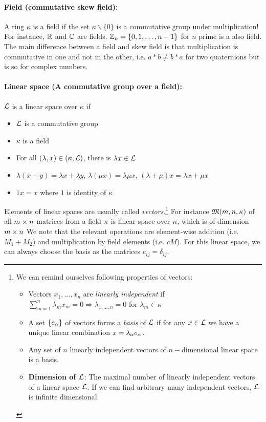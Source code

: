 \paragraph{Field (commutative skew field):} A ring $\kappa$ is a field if the set $\kappa\backslash \{0\}$ is a commutative group under multiplication! For instance, $\mathbb{R}$ and $\mathbb{C}$ are fields. $\mathbb{Z}_n=\{0,1,\dots,n-1\}$ for $n$ prime is a also field. The main difference between a field and skew field is that multiplication is commutative in one and not in the other, i.e. $a*b\ne b*a$ for two quaternions but is so for complex numbers.

\paragraph{Linear space (A commutative group over a field):} $\mathcal{L}$ is a linear space over $\kappa$ if
\begin{itemize}
	\item  $\mathcal{L}$ is a commutative group
	\item $\kappa$ is a field
	\item For all $(\lambda,x)\in (\kappa,\mathcal{L})$, there is $\lambda x\in \mathcal{L}$
	\item $\lambda(x+y)=\lambda x+\lambda y$, $\lambda (\mu x)=\lambda \mu x$, $(\lambda+\mu)x=\lambda x+\mu x$
	\item $1x=x$ where $1$ is identity of $\kappa$
\end{itemize}
Elements of linear spaces are usually called \emph{vectors}.\footnote{
	We can remind ourselves following properties of vectors:
	\begin{itemize}
		\item 
		Vectors $x_1,\dots,x_n$ are \emph{linearly independent} if $\sum\limits_{m=1}^{n}\lambda_mx_m=0 \Rightarrow \lambda_{1,\dots,n}=0$ for $\lambda_m\in \kappa$
		\item A set $\{e_\alpha\}$ of vectors forms a \emph{basis} of $\mathcal{L}$ if for any $x\in \mathcal{L}$ we have a unique linear combination $x=\lambda_\alpha e_\alpha$.
		\item Any set of $n$ linearly independent vectors of $n-$dimensional linear space is a basis.
		\item \textbf{Dimension of $\mathcal{L}$}: The maximal number of linearly independent vectors of a linear space $\mathcal{L}$. If we can find arbitrary many independent vectors, $\mathcal{L}$ is infinite dimensional.
	\end{itemize}
} For instance $\mathfrak{M}(m,n,\kappa)$ of all $m\times n$ matrices from a field $\kappa$ is linear space over $\kappa$, which is of dimension $m\times n$ We note that the relevant operations are element-wise addition (i.e. $M_1+M_2$) and multiplication by field elements (i.e. $cM$). For this linear space, we can always choose the basis as the matrices $e_{ij}=\delta_{ij}$.


